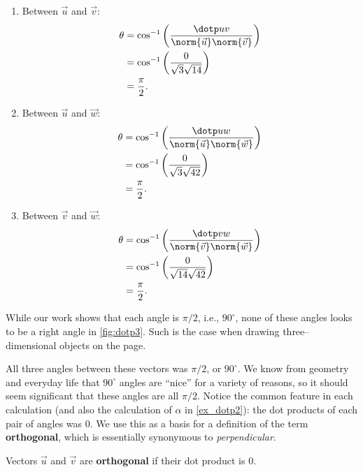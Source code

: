 {\begin{enumerate}
	\item Between $\vec u$ and $\vec v$:
	\begin{align*}
		\theta &= \cos^{-1}\left(\frac{\dotp uv}{\norm{\vec u}\norm{\vec v}}\right)\\
		&= \cos^{-1}\left(\frac{0}{\sqrt{3}\sqrt{14}}\right)\\
		&= \frac{\pi}2.
	\end{align*}
	\item	Between $\vec u$ and $\vec w$:
	\begin{align*}
		\theta &= \cos^{-1}\left(\frac{\dotp uw}{\norm{\vec u}\norm{\vec w}}\right)\\
		&= \cos^{-1}\left(\frac{0}{\sqrt{3}\sqrt{42}}\right)\\
		&= \frac{\pi}2.
	\end{align*}
	\item	Between $\vec v$ and $\vec w$:
	\begin{align*}
		\theta &= \cos^{-1}\left(\frac{\dotp vw}{\norm{\vec v}\norm{\vec w}}\right)\\
		&= \cos^{-1}\left(\frac{0}{\sqrt{14}\sqrt{42}}\right)\\
		&= \frac{\pi}2.
	\end{align*}
\end{enumerate}
While our work shows that each angle is $\pi/2$, i.e.,  $90^\circ$, none of these angles looks to be a right angle in \autoref{fig:dotp3}. Such is the case when drawing three--dimensional objects on the page.}

All three angles between these vectors was $\pi/2$, or $90^\circ$. We know from geometry and everyday life that $90^\circ$ angles are ``nice'' for a variety of reasons, so it should seem significant that these angles are all $\pi/2$. Notice the common feature in each calculation (and also the calculation of $\alpha$ in \autoref{ex_dotp2}): the dot products of each pair of angles was 0. We use this as a basis for a definition of the term \textbf{orthogonal}, which is essentially synonymous to \textit{perpendicular}.

{Vectors $\vec u$ and $\vec v$ are \textbf{orthogonal} if their dot product is 0.
}

